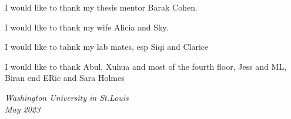 \thesisacknowledgments

I would like to thank my thesis mentor Barak Cohen.

I would like to thank my wife Alicia and Sky.

I would like to tahnk my lab mates, esp Siqi and Clarice

I would like to thank Abul, Xuhua and most of the fourth floor, Jess and ML, Biran end ERic and Sara Holmes
 

\null\hfill \thesisauthor

\noindent
\textit{Washington University in St.\@ Louis}\\
\textit{May 2023}
